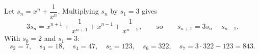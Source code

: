 Let $s_n=x^n+\dfrac{1}{x^n}$. Multiplying $s_n$ by $s_1=3$ gives
\[3s_n=x^{n+1}+\dfrac{1}{x^{n+1}}+x^{n-1}+\dfrac{1}{x^{n-1}},\qquad\text{so}\qquad s_{n+1}=3s_n-s_{n-1}.\]
With $s_0=2$ and $s_1=3$:
\[s_2=7,\quad s_3=18,\quad s_4=47,\quad s_5=123,\quad s_6=322,\quad s_7=3\cdot322-123=\boxed{843}.\]
